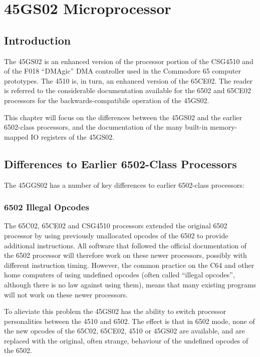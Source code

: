 \chapter{45GS02 Microprocessor}

\section{Introduction}

The 45GS02 is an enhanced version of the processor portion of the CSG4510
and of the F018 ``DMAgic'' DMA controller used in the Commodore 65 computer prototypes.  The 4510 is, in turn,
an enhanced version of the 65CE02.  
The reader is referred to
the considerable documentation available for the 6502 and 65CE02 processors
for the backwards-compatibile operation of the 45GS02.

This chapter will
focus on the differences between the 45GS02 and the earlier 6502-class
processors, and the documentation of the many built-in memory-mapped IO
registers of the 45GS02.

\section{Differences to Earlier 6502-Class Processors}

The 45GGS02 has a number of key differences to earlier 6502-class processors:

\subsection{6502 Illegal Opcodes}

The 65C02, 65CE02 and CSG4510 processors extended the original 6502 processor
by using previously unallocated opcodes of the 6502 to provide additional
instructions.  All software that followed the official documentation of the 6502
processor will therefore work on these newer processors, possibly with different
instruction timing.  However, the common practice on the C64 and other home computers
of using undefined opcodes (often called ``illegal opcodes'', although there is no
law against using them), means that many existing programs will not work on these
newer processors.

To alieviate this problem the 45GS02 has the ability to switch processor personalities
between the 4510 and 6502.  The effect is that in 6502 mode, none of the new opcodes of
the 65C02, 65CE02, 4510 or 45GS02 are available, and are replaced with the original,
often strange, behaviour of the undefined opcodes of the 6502.

